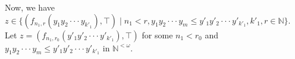 \documentclass[preprint,12pt]{elsarticle}
\numberwithin{equation}{section}
\newcommand{\up}{\mathord{\uparrow}\hspace{0.05em}}
\begin{document}

Now, we have $z\in\{(f_{n_{1},r}(y_{1}y_{2}\cdot\cdot\cdot y_{k'_{1}}),\top)\mid n_{1}<r, y_{1}y_{2}\cdot\cdot\cdot y_{m}\leq y'_{1}y'_{2}\cdot\cdot\cdot y'_{k'_{1}},k'_{1},r\in\mathbb{N}\}$. Let $z=(f_{n_{1},r_{0}}(y'_{1}y'_{2}\cdot\cdot\cdot y'_{k'_{1}}),\top)$ for some $n_{1}<r_{0}$ and $y_{1}y_{2}\cdot\cdot\cdot y_{m}\leq y'_{1}y'_{2}\cdot\cdot\cdot y'_{k'_{1}}$ in $\mathbb{N}^{<\omega}$.

\end{document}
